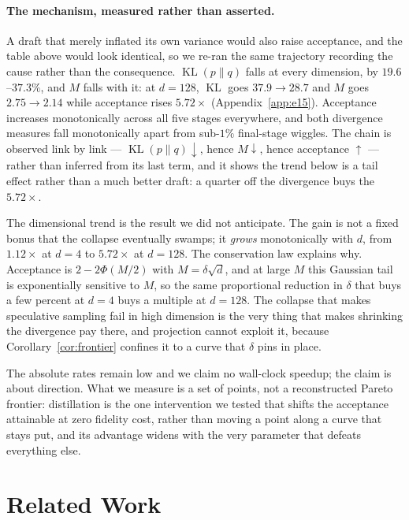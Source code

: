 \documentclass[10pt]{article}
\DeclareMathOperator{\KL}{KL}
\newcommand{\dd}{d}
\newcommand{\best}[1]{\bm{#1}}
\begin{document}
\paragraph{The mechanism, measured rather than asserted.} A draft that merely inflated its own
variance would also raise acceptance, and the table above would look identical, so we re-ran the same
trajectory recording the cause rather than the consequence. $\KL(p\|q)$ falls at every dimension, by
$19.6$--$37.3\%$, and $M$ falls with it: at $\dd{=}128$, $\KL$ goes $37.9 \to 28.7$ and $M$ goes
$2.75 \to 2.14$ while acceptance rises $5.72\times$ (Appendix~\ref{app:e15}). Acceptance increases
monotonically across all five stages everywhere, and both divergence measures fall monotonically
apart from sub-$1\%$ final-stage wiggles. The chain is observed link by link ---
$\KL(p\|q)\downarrow$, hence $M\downarrow$, hence acceptance $\uparrow$ --- rather than inferred from
its last term, and it shows the trend below is a tail effect rather than a much better draft: a
quarter off the divergence buys the $5.72\times$.

The dimensional trend is the result we did not anticipate. The gain is not a fixed bonus that the
collapse eventually swamps; it \emph{grows} monotonically with $\dd$, from $\best{1.12\times}$ at
$\dd{=}4$ to $\best{5.72\times}$ at $\dd{=}128$. The conservation law explains why. Acceptance is
$2 - 2\Phi(M/2)$ with $M = \delta\sqrt{\dd}$, and at large $M$ this Gaussian tail is exponentially
sensitive to $M$, so the same proportional reduction in $\delta$ that buys a few percent at $\dd{=}4$
buys a multiple at $\dd{=}128$. The collapse that makes speculative sampling fail in high dimension
is the very thing that makes shrinking the divergence pay there, and projection cannot exploit it,
because Corollary~\ref{cor:frontier} confines it to a curve that $\delta$ pins in place.

The absolute rates remain low and we claim no wall-clock speedup; the claim is about direction. What
we measure is a set of points, not a reconstructed Pareto frontier: distillation is the one
intervention we tested that shifts the acceptance attainable at zero fidelity cost, rather than
moving a point along a curve that stays put, and its advantage widens with the very parameter that
defeats everything else.

\section{Related Work}
\label{sec:related}
\end{document}
